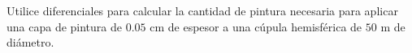 \item Utilice diferenciales para calcular la cantidad de pintura necesaria para aplicar una capa de pintura de $0.05 \text{ cm}$ de espesor a una cúpula hemisférica de $50 \text{ m}$ de diámetro.
